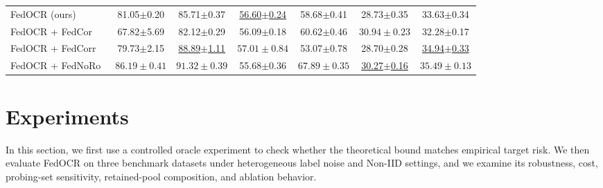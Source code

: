 ﻿\documentclass[conference]{IEEEtran}
\theoremstyle{definition}
\theoremstyle{remark}
\begin{document}
\begin{table}[!t]
\begin{tabular}{lcccccc}
		\midrule
		FedOCR (ours) & 81.05$\pm$0.20 & 85.71$\pm$0.37 & \underline{56.60$\pm$0.24} & 58.68$\pm$0.41 & 28.73$\pm$0.35 & 33.63$\pm$0.34 \\
		FedOCR + FedCor~\cite{tang2022fedcor} & 67.82$\pm$5.69 & 82.12$\pm$0.29 & 56.09$\pm$0.18 & 60.62$\pm$0.46 & $\boldsymbol{30.94\pm0.23}$ & 32.28$\pm$0.17 \\
		FedOCR + FedCorr~\cite{xu2022fedcorr} & 79.73$\pm$2.15 & \underline{88.89$\pm$1.11} & $\boldsymbol{57.01\pm0.84}$ & 53.07$\pm$0.78 & 28.70$\pm$0.28 & \underline{34.94$\pm$0.33} \\
		FedOCR + FedNoRo~\cite{wu2023fednoro} & $\boldsymbol{86.19\pm0.41}$ & $\boldsymbol{91.32\pm0.39}$ & 55.68$\pm$0.36 & $\boldsymbol{67.89\pm0.35}$ & \underline{30.27$\pm$0.16} & $\boldsymbol{35.49\pm0.13}$ \\
		\bottomrule
	\end{tabular}
\end{table}

\section{Experiments}
\label{sec:experiment}
In this section, we first use a controlled oracle experiment to check whether the theoretical bound matches empirical target risk. We then evaluate FedOCR on three benchmark datasets under heterogeneous label noise and Non-IID settings, and we examine its robustness, cost, probing-set sensitivity, retained-pool composition, and ablation behavior.
\end{document}
